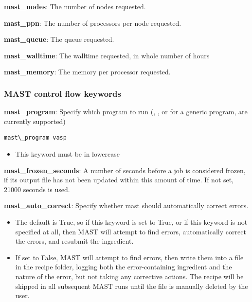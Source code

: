 \documentclass[letterpaper,10pt,english]{sphinxmanual}
\begin{document}
\textbf{mast\_nodes}: The number of nodes requested.

\textbf{mast\_ppn}: The number of processors per node requested.

\textbf{mast\_queue}: The queue requested.

\textbf{mast\_walltime}: The walltime requested, in whole number of hours

\textbf{mast\_memory}: The memory per processor requested.


\subsubsection{MAST control flow keywords}
\label{3_1_2_ingredients:mast-control-flow-keywords}
\textbf{mast\_program}: Specify which program to run (, , or  for a generic program, are currently supported)

\begin{Verbatim}[commandchars=\\\{\}]
mast\_program vasp
\end{Verbatim}
\begin{itemize}
\item {} 
This keyword must be in lowercase

\end{itemize}

\textbf{mast\_frozen\_seconds}: A number of seconds before a job is considered frozen, if its output file has not been updated within this amount of time. If not set, 21000 seconds is used.

\textbf{mast\_auto\_correct}: Specify whether mast should automatically correct errors.
\begin{itemize}
\item {} 
The default is True, so if this keyword is set to True, or if this keyword is not specified at all, then MAST will attempt to find errors, automatically correct the errors, and resubmit the ingredient.

\item {} 
If set to False, MAST will attempt to find errors, then write them into a  file in the recipe folder, logging both the error-containing ingredient and the nature of the error, but not taking any corrective actions. The recipe will be skipped in all subsequent MAST runs until the  file is manually deleted by the user.

\end{itemize}
\end{document}
